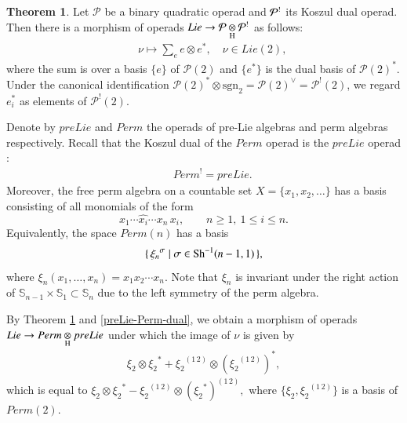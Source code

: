 \documentclass[12pt]{amsart}
\theoremstyle{definition}
\newtheorem{thm}{Theorem}[section]
\newcommand{\ot}{\otimes}
\newcommand{\s}{\mathbb{S}}
\newcommand{\op}{\mathcal{P}}
\newcommand{\opup}{\mathcal{P}^{\textup{!}}}
\newcommand{\Sh}{{\rm Sh}}
\begin{document}
\begin{thm}\cite{GK,LV}\label{Lie-pp}
	Let $\mathcal{P}$ be a binary quadratic operad and $\mathcal{P}^{\textup{!}}$ its Koszul dual operad. Then there is a morphism of operads $Lie\to \op\underset{\rm H}{\ot} \opup$ as follows:
	\begin{eqnarray*}
		&&\nu\mapsto \sum\limits_{e} e\ot e^*, \quad \nu\in Lie(2),
	\end{eqnarray*}
	where the sum is over a basis $\{e\}$ of $\op(2)$ and $\{e^*\}$ is the dual basis of $\op(2)^*$. Under the canonical identification $\op(2)^*\otimes\mathrm{sgn}_2=\op(2)^\vee=\op^!(2)$, we regard $e_i^*$ as elements of $\op^!(2)$.%
\end{thm}


Denote by $preLie$ and $Perm$   the operads of pre-Lie algebras and perm algebras respectively. Recall that the Koszul dual of the $Perm$ operad is the $preLie$ operad \cite{CL}:
\begin{eqnarray}\label{preLie-Perm-dual}
&&{Perm}^! = preLie.
\end{eqnarray}
Moreover, the free perm algebra on a countable set $X=\{x_1, x_2, \dots\}$ has a basis consisting of all monomials of the form \cite{C}
\[
x_1\cdots\widehat{x_i}\cdots x_n\,x_i, \qquad n\ge 1,\ 1\le i\le n.
\]
Equivalently, the space $Perm(n)$ has a basis
\[
\{\, {\xi_n}^\sigma \mid \sigma\in\Sh^{-1}(n-1,1) \,\},
\]
where $\xi_n(x_1,\dots,x_n)=x_1x_2\cdots x_n$.
Note that $\xi_n$ is invariant under the right action of $\s_{n-1}\times \s_1\subset \s_n$ due to the left symmetry of the perm algebra.




By Theorem \ref{Lie-pp} and \eqref{preLie-Perm-dual}, we obtain a morphism of operads $Lie \to Perm\underset{\rm H}{\ot} preLie$ under which the image of $\nu$ is given by
\begin{align*}
\xi_2\ot {\xi_2}^*+{\xi_2}^{(1\,2)}\ot ({\xi_2}^{(1\,2)})^*,
\end{align*}
which is equal to $\xi_2\ot {\xi_2}^*-{\xi_2}^{(1\,2)}\ot ({\xi_2}^*)^{(1\,2)},$
where $\{\xi_2, {\xi_2}^{(1\,2)}\}$ is a basis of $Perm(2)$.
\end{document}
